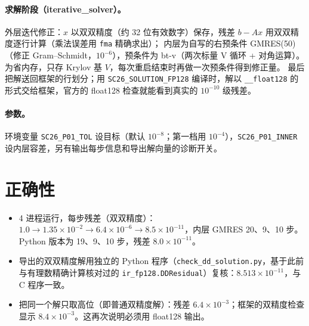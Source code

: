 \documentclass[11pt,a4paper]{ctexart}
\begin{document}
\paragraph{求解阶段（iterative\_solver）。}外层迭代修正：$x$ 以双双精度（约 32 位有效数字）保存，残差 $b-Ax$ 用双双精度逐行计算（乘法误差用 \texttt{fma} 精确求出）；
内层为自写的右预条件 GMRES(50)（修正 Gram--Schmidt，$10^{-6}$），预条件为 bt-v（两次标量 V 循环 + 对角运算）。为省内存，只存 Krylov 基 $V$，每次重启结束时再做一次预条件得到修正量。
最后把解送回框架的行划分；用 \texttt{SC26\_SOLUTION\_FP128} 编译时，解以 \texttt{\_\_float128} 的形式交给框架，官方的 float128 检查就能看到真实的 $10^{-10}$ 级残差。
\paragraph{参数。}环境变量 \texttt{SC26\_P01\_TOL} 设目标（默认 $10^{-8}$；第一档用 $10^{-4}$），\texttt{SC26\_P01\_INNER} 设内层容差，另有输出每步信息和导出解向量的诊断开关。

\section{正确性}
\begin{itemize}
\item 4 进程运行，每步残差（双双精度）：$1.0\to1.35\times10^{-2}\to6.4\times10^{-6}\to8.5\times10^{-11}$，内层 GMRES 20、9、10 步。Python 版本为 19、9、10 步，残差 $8.0\times10^{-11}$。
\item 导出的双双精度解用独立的 Python 程序（\texttt{check\_dd\_solution.py}，基于此前与有理数精确计算核对过的 \texttt{ir\_fp128.DDResidual}）复核：$8.513\times10^{-11}$，与 C 程序一致。
\item 把同一个解只取高位（即普通双精度解）：残差 $6.4\times10^{-3}$；框架的双精度检查显示 $8.4\times10^{-3}$。这再次说明必须用 float128 输出。
\end{itemize}
\end{document}
